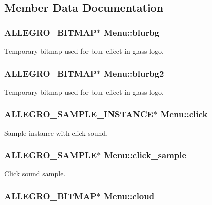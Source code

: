 \subsection{Member Data Documentation}
\hypertarget{structMenu_ac5a4b29925ad8348687309b38ad37081}{
\subsubsection[{blurbg}]{\setlength{\rightskip}{0pt plus 5cm}A\-L\-L\-E\-G\-R\-O\-\_\-\-B\-I\-T\-M\-A\-P$\ast$ Menu\-::blurbg}}\label{structMenu_ac5a4b29925ad8348687309b38ad37081}
Temporary bitmap used for blur effect in glass logo. \hypertarget{structMenu_acf060e754cd17ee89d5164043058dbb7}{
\subsubsection[{blurbg2}]{\setlength{\rightskip}{0pt plus 5cm}A\-L\-L\-E\-G\-R\-O\-\_\-\-B\-I\-T\-M\-A\-P$\ast$ Menu\-::blurbg2}}\label{structMenu_acf060e754cd17ee89d5164043058dbb7}
Temporary bitmap used for blur effect in glass logo. \hypertarget{structMenu_a8f8e8b511a64f03e71259dde1a7bf6f2}{
\subsubsection[{click}]{\setlength{\rightskip}{0pt plus 5cm}A\-L\-L\-E\-G\-R\-O\-\_\-\-S\-A\-M\-P\-L\-E\-\_\-\-I\-N\-S\-T\-A\-N\-C\-E$\ast$ Menu\-::click}}\label{structMenu_a8f8e8b511a64f03e71259dde1a7bf6f2}
Sample instance with click sound. \hypertarget{structMenu_a012f284df5f9d8e39785a264c736c506}{
\subsubsection[{click\-\_\-sample}]{\setlength{\rightskip}{0pt plus 5cm}A\-L\-L\-E\-G\-R\-O\-\_\-\-S\-A\-M\-P\-L\-E$\ast$ Menu\-::click\-\_\-sample}}\label{structMenu_a012f284df5f9d8e39785a264c736c506}
Click sound sample. \hypertarget{structMenu_a9abb4b7b9f726884aa378e746857b6f2}{
\subsubsection[{cloud}]{\setlength{\rightskip}{0pt plus 5cm}A\-L\-L\-E\-G\-R\-O\-\_\-\-B\-I\-T\-M\-A\-P$\ast$ Menu\-::cloud}}\label{structMenu_a9abb4b7b9f726884aa378e746857b6f2}

